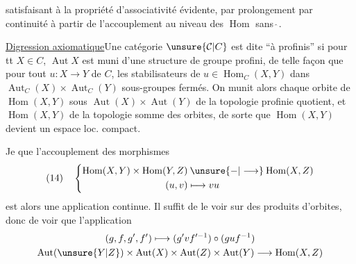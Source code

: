 satisfaisant à la propriété d'associativité évidente, par prolongement par continuité à partir de l'accouplement au niveau des $\operatorname{Hom}$ sans $\hat{\ }$. 

\uline{Digression axiomatique}\quad Une catégorie $\unsure{\mathcal{C}|C}$ est dite   ``à   profinis'' si pour tt $X\in C$, $\operatorname{Aut}X$ est muni d'une structure de groupe profini, de telle façon que pour tout $u:X\longrightarrow Y$ de $C$, les stabilisateurs de $u\in\operatorname{Hom}_C(X,Y)$ dans $\operatorname{Aut}_C(X)\times\operatorname{Aut}_C(Y)$    sous-groupes fermés.  On munit alors chaque orbite de $\operatorname{Hom}(X,Y)$ sous $\operatorname{Aut}(X)\times\operatorname{Aut}(Y)$ de la topologie profinie quotient, et $\operatorname{Hom}(X,Y)$ de la topologie  somme des orbites, de sorte que $\operatorname{Hom}(X,Y)$ devient un espace loc. compact.

Je   que l'accouplement des morphismes
\[
(14)\quad\left\{
\begin{aligned}
\operatorname{Hom}(X,Y)\times\operatorname{Hom}(Y,Z)&\mathbin{\unsure{-|\longrightarrow}}\operatorname{Hom}(X,Z)\\
(u,v)&\longmapsto vu
\end{aligned}\right.
\]
est alors  une  application continue. Il suffit de le voir sur des produits d'orbites, donc de voir que  l'application
\[
\begin{gathered}
(g,f,g',f')\longmapsto(g'vf'^{-1})\circ(guf^{-1})\\
\operatorname{Aut}(\unsure{Y|Z})\times\operatorname{Aut}(X)\times\operatorname{Aut}(Z)\times\operatorname{Aut}(Y)\longrightarrow\operatorname{Hom}(X,Z)
\end{gathered}
\]
